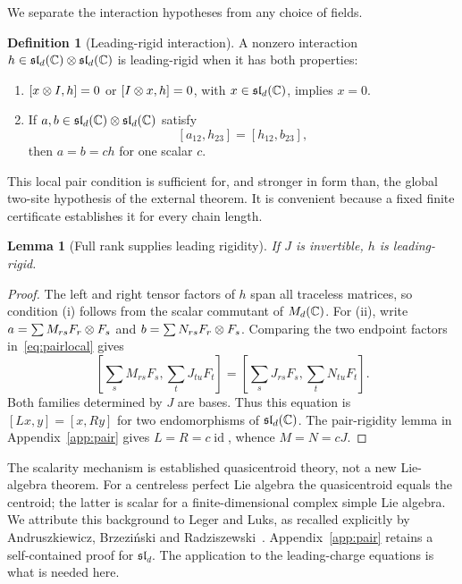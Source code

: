 \documentclass[11pt,a4paper]{article}
\numberwithin{equation}{section}
\newtheorem{lemma}[theorem]{Lemma}
\theoremstyle{definition}\newtheorem{definition}[theorem]{Definition}
\theoremstyle{remark}\newtheorem{remark}[theorem]{Remark}
\newcommand{\g}{\mathfrak{sl}_d(\C)}\newcommand{\id}{\operatorname{id}}
\begin{document}
We separate the interaction hypotheses from any choice of fields.

\begin{definition}[Leading-rigid interaction]\label{def:rigid}
A nonzero interaction $h\in\g\tens\g$ is leading-rigid when it has both properties:
\begin{enumerate}[label=(\roman*),leftmargin=7mm,itemsep=1pt]
\item $[x\otimes I,h]=0$ or $[I\otimes x,h]=0$, with $x\in\g$, implies $x=0$.
\item If $a,b\in\g\tens\g$ satisfy
\begin{equation}\label{eq:pairlocal}
 [a_{12},h_{23}]=[h_{12},b_{23}],
\end{equation}
then $a=b=ch$ for one scalar $c$.
\end{enumerate}
\end{definition}

This local pair condition is sufficient for, and stronger in form than, the global two-site hypothesis of the external theorem. It is convenient because a fixed finite certificate establishes it for every chain length.

\begin{lemma}[Full rank supplies leading rigidity]\label{lem:fullrank}
If $J$ is invertible, $h$ is leading-rigid.
\end{lemma}
\begin{proof}
The left and right tensor factors of $h$ span all traceless matrices, so condition (i) follows from the scalar commutant of $M_d(\mathbb C)$. For (ii), write $a=\sum M_{rs}F_r\otimes F_s$ and $b=\sum N_{rs}F_r\otimes F_s$. Comparing the two endpoint factors in~\eqref{eq:pairlocal} gives
\[
 \left[\sum_sM_{rs}F_s,\sum_tJ_{tu}F_t\right]
 =\left[\sum_sJ_{rs}F_s,\sum_tN_{tu}F_t\right].
\]
Both families determined by $J$ are bases. Thus this equation is $[Lx,y]=[x,Ry]$ for two endomorphisms of $\g$. The pair-rigidity lemma in Appendix~\ref{app:pair} gives $L=R=c\id$, whence $M=N=cJ$.
\end{proof}

The scalarity mechanism is established quasicentroid theory, not a new Lie-algebra theorem. For a centreless perfect Lie algebra the quasicentroid equals the centroid; the latter is scalar for a finite-dimensional complex simple Lie algebra. We attribute this background to Leger and Luks, as recalled explicitly by Andruszkiewicz, Brzezi\'nski and Radziszewski~\cite{LegerLuks,ABR}. Appendix~\ref{app:pair} retains a self-contained proof for $\mathfrak{sl}_d$. The application to the leading-charge equations is what is needed here.
\end{document}

